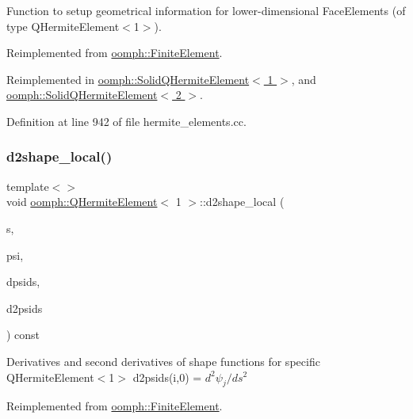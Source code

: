 Function to setup geometrical information for lower-\/dimensional Face\+Elements (of type Q\+Hermite\+Element$<$1$>$). 

Reimplemented from \hyperlink{classoomph_1_1FiniteElement_aaf7bead5b462cfd5401d97b3dbdc7af7}{oomph\+::\+Finite\+Element}.



Reimplemented in \hyperlink{classoomph_1_1SolidQHermiteElement_a4e81780865998f59277d7424217ec7c1}{oomph\+::\+Solid\+Q\+Hermite\+Element$<$ 1 $>$}, and \hyperlink{classoomph_1_1SolidQHermiteElement_a4e81780865998f59277d7424217ec7c1}{oomph\+::\+Solid\+Q\+Hermite\+Element$<$ 2 $>$}.



Definition at line 942 of file hermite\+\_\+elements.\+cc.

\mbox{\label{classoomph_1_1QHermiteElement_aaaaf8865ec4b0982be8520508d92f5be}} 
\subsubsection{\texorpdfstring{d2shape\+\_\+local()}{d2shape\_local()}\hspace{0.1cm}{\footnotesize\ttfamily [1/3]}}
{\footnotesize\ttfamily template$<$$>$ \\
void \hyperlink{classoomph_1_1QHermiteElement}{oomph\+::\+Q\+Hermite\+Element}$<$ 1 $>$\+::d2shape\+\_\+local (\begin{DoxyParamCaption}\item[{const \hyperlink{classoomph_1_1Vector}{Vector}$<$ double $>$ \&}]{s,  }\item[{\hyperlink{classoomph_1_1Shape}{Shape} \&}]{psi,  }\item[{\hyperlink{classoomph_1_1DShape}{D\+Shape} \&}]{dpsids,  }\item[{\hyperlink{classoomph_1_1DShape}{D\+Shape} \&}]{d2psids }\end{DoxyParamCaption}) const\hspace{0.3cm}{\ttfamily [virtual]}}

Derivatives and second derivatives of shape functions for specific Q\+Hermite\+Element$<$1$>$ d2psids(i,0) = $ d^2 \psi_j / d s^2 $ 

Reimplemented from \hyperlink{classoomph_1_1FiniteElement_a53e5051582d9da07b9d35da9debd0cd7}{oomph\+::\+Finite\+Element}.



